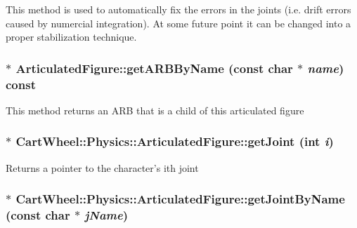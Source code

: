 This method is used to automatically fix the errors in the joints (i.e. drift errors caused by numercial integration). At some future point it can be changed into a proper stabilization technique. \hypertarget{classCartWheel_1_1Physics_1_1ArticulatedFigure_a26a2bdded2da09108ac87528fd6d2985}{
\subsubsection[{getARBByName}]{ $\ast$ ArticulatedFigure::getARBByName (const char $\ast$ {\em name}) const}}
\label{classCartWheel_1_1Physics_1_1ArticulatedFigure_a26a2bdded2da09108ac87528fd6d2985}
This method returns an ARB that is a child of this articulated figure \hypertarget{classCartWheel_1_1Physics_1_1ArticulatedFigure_a246d04e0805756140b239decf974cb6a}{
\subsubsection[{getJoint}]{$\ast$ CartWheel::Physics::ArticulatedFigure::getJoint (int {\em i})}}
\label{classCartWheel_1_1Physics_1_1ArticulatedFigure_a246d04e0805756140b239decf974cb6a}
Returns a pointer to the character's ith joint \hypertarget{classCartWheel_1_1Physics_1_1ArticulatedFigure_acea82656e252a6fd1368eae140f123f3}{
\subsubsection[{getJointByName}]{$\ast$ CartWheel::Physics::ArticulatedFigure::getJointByName (const char $\ast$ {\em jName})}}
